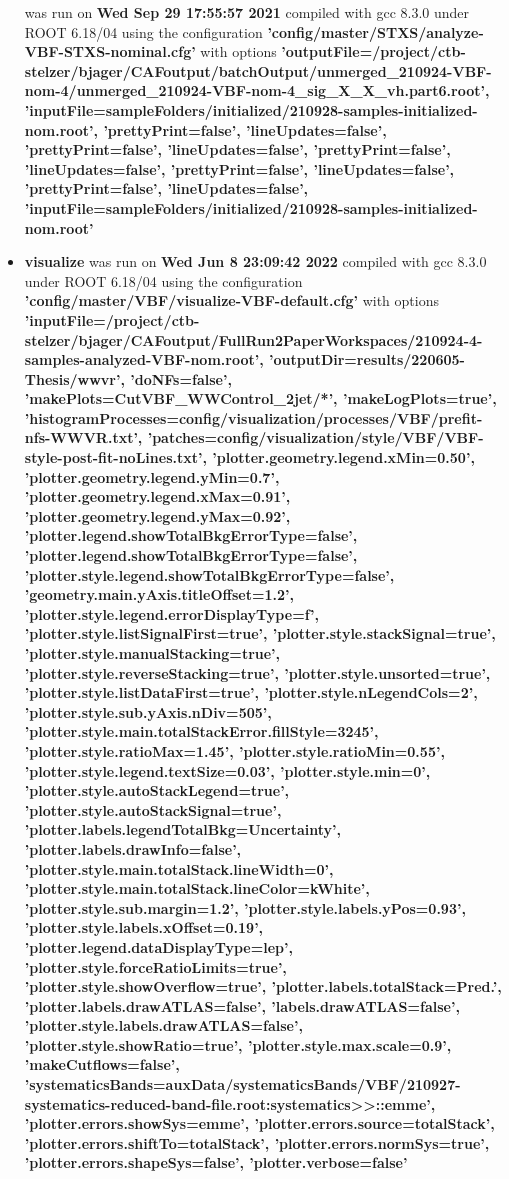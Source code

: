 \documentclass{article}
\begin{document}
\begin{itemize}
was run on \textbf{Wed Sep 29 17:55:57 2021} compiled with gcc 8.3.0 under ROOT 6.18/04 using the configuration \textbf{'config/master/STXS/analyze-VBF-STXS-nominal.cfg'} with options \textbf{'outputFile=/project/ctb-stelzer/bjager/CAFoutput/batchOutput/unmerged\_210924-VBF-nom-4/unmerged\_210924-VBF-nom-4\_sig\_X\_X\_vh.part6.root', 'inputFile=sampleFolders/initialized/210928-samples-initialized-nom.root', 'prettyPrint=false', 'lineUpdates=false', 'prettyPrint=false', 'lineUpdates=false', 'prettyPrint=false', 'lineUpdates=false', 'prettyPrint=false', 'lineUpdates=false', 'prettyPrint=false', 'lineUpdates=false', 'inputFile=sampleFolders/initialized/210928-samples-initialized-nom.root'} \item \textbf{visualize} was run on \textbf{Wed Jun  8 23:09:42 2022} compiled with gcc 8.3.0 under ROOT 6.18/04 using the configuration \textbf{'config/master/VBF/visualize-VBF-default.cfg'} with options \textbf{'inputFile=/project/ctb-stelzer/bjager/CAFoutput/FullRun2PaperWorkspaces/210924-4-samples-analyzed-VBF-nom.root', 'outputDir=results/220605-Thesis/wwvr', 'doNFs=false', 'makePlots=CutVBF\_WWControl\_2jet/*', 'makeLogPlots=true', 'histogramProcesses=config/visualization/processes/VBF/prefit-nfs-WWVR.txt', 'patches=config/visualization/style/VBF/VBF-style-post-fit-noLines.txt', 'plotter.geometry.legend.xMin=0.50', 'plotter.geometry.legend.yMin=0.7', 'plotter.geometry.legend.xMax=0.91', 'plotter.geometry.legend.yMax=0.92', 'plotter.legend.showTotalBkgErrorType=false', 'plotter.legend.showTotalBkgErrorType=false', 'plotter.style.legend.showTotalBkgErrorType=false', 'geometry.main.yAxis.titleOffset=1.2', 'plotter.style.legend.errorDisplayType=f', 'plotter.style.listSignalFirst=true', 'plotter.style.stackSignal=true', 'plotter.style.manualStacking=true', 'plotter.style.reverseStacking=true', 'plotter.style.unsorted=true', 'plotter.style.listDataFirst=true', 'plotter.style.nLegendCols=2', 'plotter.style.sub.yAxis.nDiv=505', 'plotter.style.main.totalStackError.fillStyle=3245', 'plotter.style.ratioMax=1.45', 'plotter.style.ratioMin=0.55', 'plotter.style.legend.textSize=0.03', 'plotter.style.min=0', 'plotter.style.autoStackLegend=true', 'plotter.style.autoStackSignal=true', 'plotter.labels.legendTotalBkg=Uncertainty', 'plotter.labels.drawInfo=false', 'plotter.style.main.totalStack.lineWidth=0', 'plotter.style.main.totalStack.lineColor=kWhite', 'plotter.style.sub.margin=1.2', 'plotter.style.labels.yPos=0.93', 'plotter.style.labels.xOffset=0.19', 'plotter.legend.dataDisplayType=lep', 'plotter.style.forceRatioLimits=true', 'plotter.style.showOverflow=true', 'plotter.labels.totalStack=Pred.', 'plotter.labels.drawATLAS=false', 'labels.drawATLAS=false', 'plotter.style.labels.drawATLAS=false', 'plotter.style.showRatio=true', 'plotter.style.max.scale=0.9', 'makeCutflows=false', 'systematicsBands=auxData/systematicsBands/VBF/210927-systematics-reduced-band-file.root:systematics>>::emme', 'plotter.errors.showSys=emme', 'plotter.errors.source=totalStack', 'plotter.errors.shiftTo=totalStack', 'plotter.errors.normSys=true', 'plotter.errors.shapeSys=false', 'plotter.verbose=false'} \end{itemize}
\end{document}
